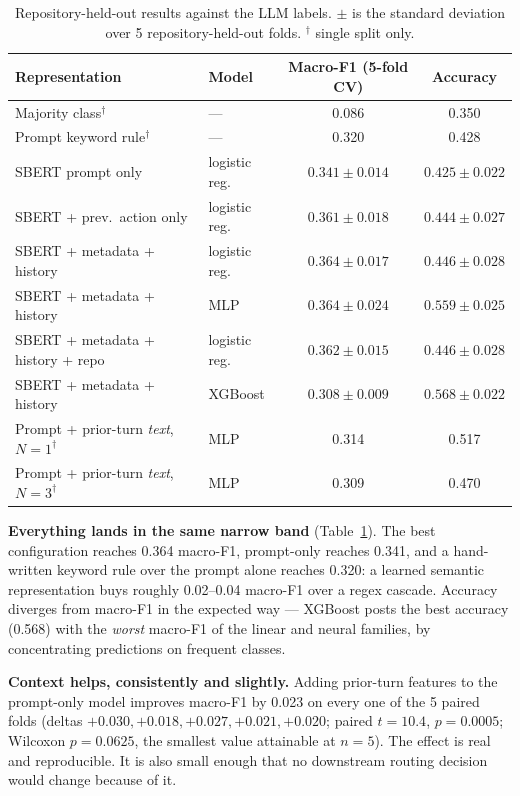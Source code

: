\documentclass[10pt]{article}
\begin{document}
\begin{table}[t]
\centering
\small
\begin{tabular}{llcc}
\toprule
Representation & Model & Macro-F1 (5-fold CV) & Accuracy \\
\midrule
Majority class$^\dagger$ & --- & 0.086 & 0.350 \\
Prompt keyword rule$^\dagger$ & --- & 0.320 & 0.428 \\
\midrule
SBERT prompt only & logistic reg. & $0.341 \pm 0.014$ & $0.425 \pm 0.022$ \\
SBERT + prev.\ action only & logistic reg. & $0.361 \pm 0.018$ & $0.444 \pm 0.027$ \\
SBERT + metadata + history & logistic reg. & $0.364 \pm 0.017$ & $0.446 \pm 0.028$ \\
SBERT + metadata + history & MLP & $\mathbf{0.364 \pm 0.024}$ & $0.559 \pm 0.025$ \\
SBERT + metadata + history + repo & logistic reg. & $0.362 \pm 0.015$ & $0.446 \pm 0.028$ \\
SBERT + metadata + history & XGBoost & $0.308 \pm 0.009$ & $0.568 \pm 0.022$ \\
\midrule
Prompt + prior-turn \emph{text}, $N{=}1^\dagger$ & MLP & 0.314 & 0.517 \\
Prompt + prior-turn \emph{text}, $N{=}3^\dagger$ & MLP & 0.309 & 0.470 \\
\bottomrule
\end{tabular}
\caption{Repository-held-out results against the LLM labels. $\pm$ is the
standard deviation over 5 repository-held-out folds. $^\dagger$ single split
only.}
\label{tab:results}
\end{table}

\textbf{Everything lands in the same narrow band} (Table~\ref{tab:results}). The
best configuration reaches 0.364 macro-F1, prompt-only reaches 0.341, and a
hand-written keyword rule over the prompt alone reaches 0.320: a learned semantic
representation buys roughly 0.02--0.04 macro-F1 over a regex cascade. Accuracy
diverges from macro-F1 in the expected way --- XGBoost posts the best accuracy
(0.568) with the \emph{worst} macro-F1 of the linear and neural families, by
concentrating predictions on frequent classes.

\textbf{Context helps, consistently and slightly.} Adding prior-turn features to
the prompt-only model improves macro-F1 by 0.023 on every one of the 5 paired
folds (deltas $+0.030, +0.018, +0.027, +0.021, +0.020$; paired $t = 10.4$,
$p = 0.0005$; Wilcoxon $p = 0.0625$, the smallest value attainable at $n{=}5$).
The effect is real and reproducible. It is also small enough that no downstream
routing decision would change because of it.
\end{document}
